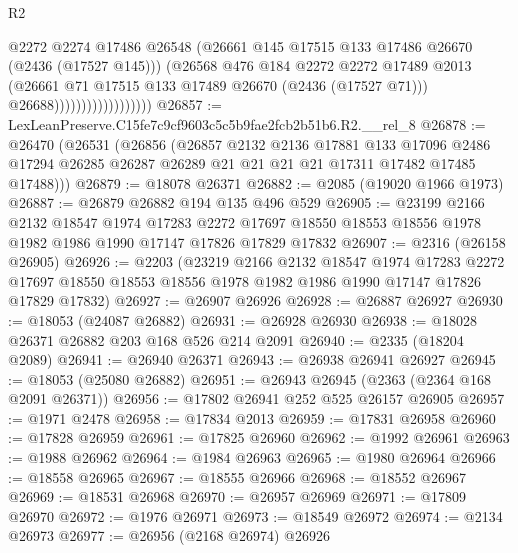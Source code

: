 \begin{lexlean}{R2}
\begin{coremodule}
                                      @2272
                                      @2274
                                      @17486
                                      @26548
                                      (@26661 @145 @17515 @133 @17486 @26670 (@2436 (@17527 @145)))
                                      (@26568
                                        @476
                                        @184
                                        @2272
                                        @2272
                                        @17489
                                        @2013
                                        (@26661 @71 @17515 @133 @17489 @26670 (@2436 (@17527 @71)))
                                        @26688))))))))))))))))))
@26857 := LexLeanPreserve.C15fe7c9cf9603c5c5b9fae2fcb2b51b6.R2.__rel_8
@26878 := @26470
    (@26531
      (@26856
        (@26857
          @2132
          @2136
          @17881
          @133
          @17096
          @2486
          @17294
          @26285
          @26287
          @26289
          @21
          @21
          @21
          @21
          @17311
          @17482
          @17485
          @17488)))
@26879 := @18078 @26371
@26882 := @2085 (@19020 @1966 @1973)
@26887 := @26879 @26882 @194 @135 @496 @529
@26905 := @23199
    @2166
    @2132
    @18547
    @1974
    @17283
    @2272
    @17697
    @18550
    @18553
    @18556
    @1978
    @1982
    @1986
    @1990
    @17147
    @17826
    @17829
    @17832
@26907 := @2316 (@26158 @26905)
@26926 := @2203
    (@23219
      @2166
      @2132
      @18547
      @1974
      @17283
      @2272
      @17697
      @18550
      @18553
      @18556
      @1978
      @1982
      @1986
      @1990
      @17147
      @17826
      @17829
      @17832)
@26927 := @26907 @26926
@26928 := @26887 @26927
@26930 := @18053 (@24087 @26882)
@26931 := @26928 @26930
@26938 := @18028 @26371 @26882 @203 @168 @526 @214 @2091
@26940 := @2335 (@18204 @2089)
@26941 := @26940 @26371
@26943 := @26938 @26941 @26927
@26945 := @18053 (@25080 @26882)
@26951 := @26943 @26945 (@2363 (@2364 @168 @2091 @26371))
@26956 := @17802 @26941 @252 @525 @26157 @26905
@26957 := @1971 @2478
@26958 := @17834 @2013
@26959 := @17831 @26958
@26960 := @17828 @26959
@26961 := @17825 @26960
@26962 := @1992 @26961
@26963 := @1988 @26962
@26964 := @1984 @26963
@26965 := @1980 @26964
@26966 := @18558 @26965
@26967 := @18555 @26966
@26968 := @18552 @26967
@26969 := @18531 @26968
@26970 := @26957 @26969
@26971 := @17809 @26970
@26972 := @1976 @26971
@26973 := @18549 @26972
@26974 := @2134 @26973
@26977 := @26956 (@2168 @26974) @26926

\end{coremodule}
\end{lexlean}
